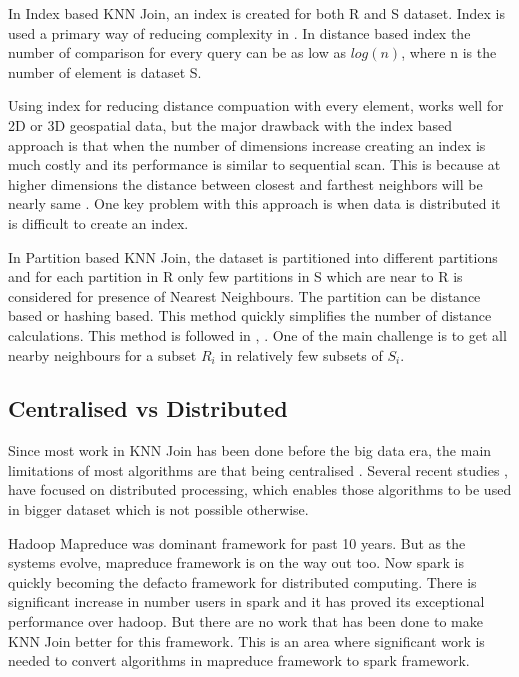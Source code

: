 \documentclass[conference]{IEEEtran}
\begin{document}
In Index based KNN Join, an index is created for both R and S
dataset. Index is used a primary way of reducing complexity in \cite{jagadish_idistance:_2005}
\cite{yu_efficient_2007} \cite{mux}. In distance based index
\cite{jagadish_idistance:_2005} the number of comparison for every
query can be as low as $log(n)$, where n is the number of element is
dataset S.

Using index for reducing distance compuation with every element, works
well for 2D or 3D geospatial data, but the major drawback with the
index based approach is that when the number of dimensions increase
creating an index is much costly and its performance is similar to
sequential scan. This is because at higher dimensions the distance
between closest and farthest neighbors will be nearly same
\cite{beyer_when_1999}. One key problem with this approach is when
data is distributed it is difficult to create an index.

\bigskip

In Partition based KNN Join, the dataset is partitioned into different
partitions and for each partition in R only few partitions in S which are
near to R is considered for presence of Nearest Neighbours. The
partition can be distance based or hashing based. This
method quickly simplifies the number of distance calculations. This method is followed in
\cite{lu_efficient_2012}, \cite{stupar_rankreduceprocessing_2010}. One
of the main challenge is to get all nearby neighbours for a subset
$R_i$ in relatively few subsets of $S_i$.

\bigskip

\subsection{Centralised vs Distributed}

Since most work in KNN Join has been done before the big data era,
the main limitations of most algorithms are that being centralised
\cite{jagadish_idistance:_2005}.
Several recent studies \cite{stupar_rankreduceprocessing_2010},
\cite{lu_efficient_2012} have focused on distributed
processing, which enables those algorithms to be used in bigger
dataset which is not possible otherwise.

Hadoop Mapreduce was dominant framework for past 10 years. But as the
systems evolve, mapreduce framework is on the way out
too. Now spark is quickly becoming the defacto framework for
distributed computing. There is significant increase in number users
in spark and it has proved its exceptional performance over
hadoop. But there are no work that has been done to make
KNN Join better for this framework. This is an area where significant
work is needed to convert algorithms in mapreduce framework to spark
framework.
\end{document}
